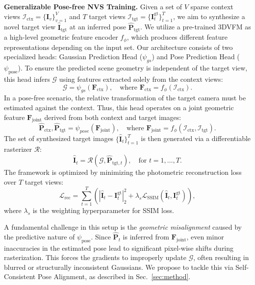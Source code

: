 \noindent \textbf{Generalizable Pose-free NVS Training.}
Given a set of $V$ sparse context views $\mathcal{I}_\text{ctx} = \{\bm{I}_v\}_{v=1}^V$ and $T$ target views $\mathcal{I}_\text{tgt} = \{\bm{I}_t^\text{gt}\}_{t=1}^T$, we aim to synthesize a novel target view $\hat{\bm{I}}_\text{tgt}$ at an inferred pose $\hat{\bm{P}}_\text{tgt}$. 
We utilize a pre-trained 3DVFM as a high-level geometric feature encoder $f_{\phi}$, which produces different feature representations depending on the input set. 
Our architecture consists of two specialized heads: Gaussian Prediction Head ($\psi_{gs}$) and Pose Prediction Head ($\psi_\text{pose}$).
To ensure the predicted scene geometry is independent of the target view, this head infers $\mathcal{G}$ using features extracted solely from the context views:
\begin{equation}
    \mathcal{G} = \psi_{gs}(\bm{F}_\text{ctx}), \quad \text{where } \bm{F}_\text{ctx} = f_{\phi}(\mathcal{I}_\text{ctx}).
\end{equation}
In a pose-free scenario, the relative transformation of the target camera must be estimated against the context. Thus, this head operates on a joint geometric feature $\bm{F}_\text{joint}$ derived from both context and target images:
\begin{equation}
    {\hat{\bm{P}}_\text{ctx}, \hat{\bm{P}}_\text{tgt}} = \psi_{pose}(\bm{F}_\text{joint}), \quad \text{where } \bm{F}_\text{joint} = f_{\phi}({\mathcal{I}_\text{ctx}, \mathcal{I}_\text{tgt}}).
\end{equation}
The set of synthesized target images $\{\hat{\bm{I}}_t\}_{t=1}^T$ is then generated via a differentiable rasterizer $\mathcal{R}$:
\begin{equation}
    \hat{\bm{I}}_t = \mathcal{R}(\mathcal{G}, \hat{\bm{P}}_{\text{tgt},t}), \quad \text{for } t=1, \dots, T.
\end{equation}
The framework is optimized by minimizing the photometric reconstruction loss over $T$ target views:
\begin{equation}
\label{eq:rec_loss}
    \mathcal{L}_\text{rec} = \sum_{t=1}^{T} \left( |\hat{\bm{I}}_t - \bm{I}_t^\text{gt}|_2^2 + \lambda_{s} \mathcal{L}_\text{SSIM}(\hat{\bm{I}}_t, \bm{I}_t^\text{gt}) \right),
\end{equation}
where \(\lambda_{s}\) is the weighting hyperparameter for SSIM loss. 

A fundamental challenge in this setup is the \textit{geometric misalignment} caused by the predictive nature of $\psi_\text{pose}$. Since $\hat{\bm{P}}_t$ is inferred from $\bm{F}_\text{joint}$, even minor inaccuracies in the estimated pose lead to significant pixel-wise shifts during rasterization. 
This forces the gradients to improperly update $\mathcal{G}$, often resulting in blurred or structurally inconsistent Gaussians. 
We propose to tackle this via Self-Consistent Pose Alignment, as described in Sec.~\ref{sec:method}.